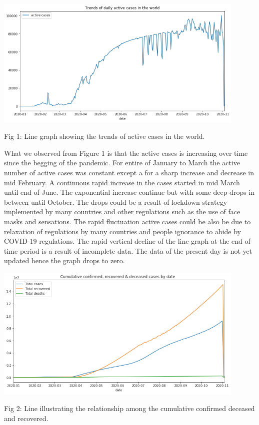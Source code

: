 \documentclass[12pt]{article}
\begin{document}
\includegraphics[width=0.9\textwidth,inner]{activecases.png}
\caption{Fig 1: Line graph showing the trends of active cases in the world.}

What we observed  from Figure 1 is that the active cases is increasing over time since the begging of the pandemic. For entire of January to March the active number of active cases was constant except a for a sharp increase and decrease in mid February. A continuous rapid increase in the cases started in mid March  until end of June. The exponential increase continue but with some deep drops in between until October.  The drops could be a result of lockdown strategy implemented by many countries and other regulations such as the use of face masks and sensations. The  rapid  fluctuation  active cases could be also be due to relaxation of regulations by many countries and people ignorance to abide by COVID-19 regulations. The rapid vertical decline of the line graph at the end of time period is a result of incomplete data. The data of the present day is not yet updated hence the graph drops to zero. 


\includegraphics[width=0.9\textwidth, inner]{line2.png}
\caption{Fig 2: Line illustrating the relationship among the cumulative confirmed deceased and recovered.}
\end{document}
